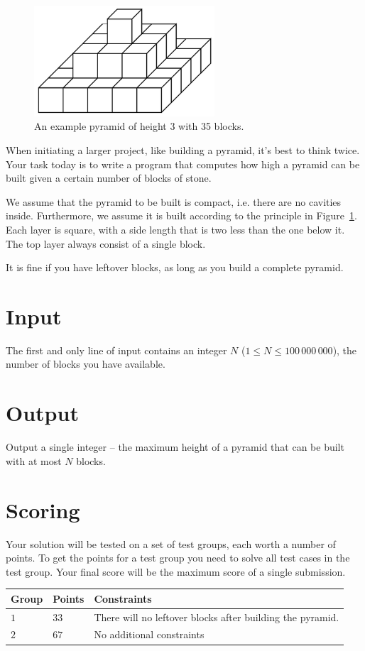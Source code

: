 
\begin{figure}[h!]
\centering
    \includegraphics[width=0.6\textwidth]{pyramid.png}
\caption{An example pyramid of height 3 with 35 blocks.}
\label{fig:pyramid}
\end{figure}

When initiating a larger project, like building a pyramid, it's best to think twice.
Your task today is to write a program that computes how high a pyramid can be built given a certain number of blocks of stone.

We assume that the pyramid to be built is compact, i.e. there are no cavities inside.
Furthermore, we assume it is built according to the principle in Figure~\ref{fig:pyramid}.
Each layer is square, with a side length that is two less than the one below it.
The top layer always consist of a single block.

It is fine if you have leftover blocks, as long as you build a complete pyramid.

\section*{Input}
The first and only line of input contains an integer $N$ ($1 \le N \le 100\,000\,000$), the number of blocks you have available.

\section*{Output}
Output a single integer -- the maximum height of a pyramid that can be built with at most $N$ blocks.

\section*{Scoring}
Your solution will be tested on a set of test groups, each worth a number of points.
To get the points for a test group you need to solve all test cases in the test group. Your final score will be the maximum score of a single submission.

\noindent
\begin{tabular}{| l | l | l |}
  \hline
  Group & Points & Constraints \\ \hline
  $1$    & $33$        &  There will no leftover blocks after building the pyramid. \\ \hline
  $2$    & $67$        &  No additional constraints \\ \hline
\end{tabular}
